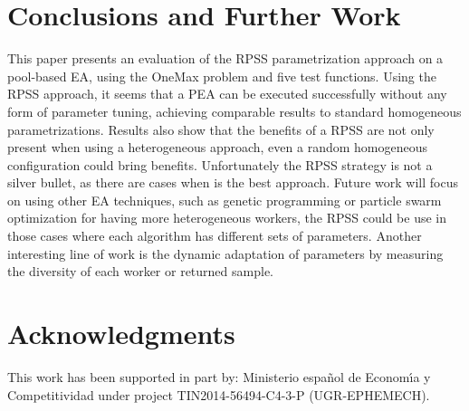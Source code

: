 \documentclass{llncs}
\begin{document}
\section{Conclusions and Further Work}
\label{sec:conclusions}
This paper presents an evaluation of the RPSS parametrization approach on 
a pool-based EA, using the OneMax problem and five test functions. 
Using the RPSS approach, it seems that a PEA can be executed successfully 
without any form of parameter tuning, achieving comparable results to standard homogeneous
parametrizations. Results also show that the benefits of a RPSS are not only present
when using a heterogeneous approach, even a random homogeneous configuration could bring
benefits. Unfortunately the RPSS strategy is not a silver bullet, as there are cases
when is the best approach. Future work will focus on using other EA techniques, 
such as genetic programming or particle swarm optimization for having more heterogeneous
workers, the RPSS could be use in those cases where each algorithm has different sets of
parameters. Another interesting line of work is the dynamic adaptation of parameters by
measuring the diversity of each worker or returned sample.   

\section*{Acknowledgments}

This work has been supported in part by:  Ministerio espa\~{n}ol de
Econom\'{\i}a y Competitividad under project TIN2014-56494-C4-3-P
(UGR-EPHEMECH).




\end{document}
